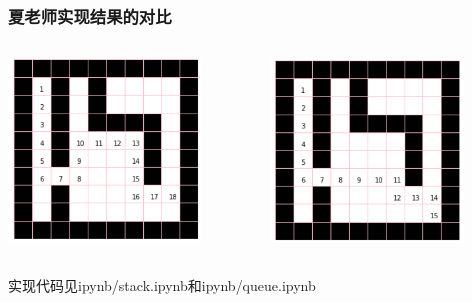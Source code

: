 \begin{frame}[fragile]
  \frametitle{夏老师实现结果的对比}
  \centering
  \begin{columns}
    \begin{column}[T]{0.5\linewidth}
      \includegraphics[width=0.8\textwidth]{figs/queue/maze_stack.png}
    \end{column}
    \begin{column}[T]{0.5\linewidth}
      \includegraphics[width=0.8\textwidth]{figs/queue/maze_queue.png}
    \end{column}
  \end{columns}

  实现代码见ipynb/stack.ipynb和ipynb/queue.ipynb
\end{frame}
